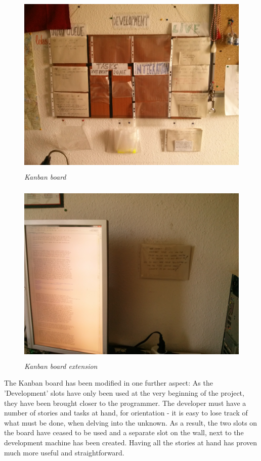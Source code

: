 \begin{figure}
\includegraphics[height=3.5in,width=6.23in]{./images/kanban/kanban_board.jpg}  
\caption{\small \sl Kanban board \label{fig:kanbanBoard}}
\end{figure}

\begin{figure}
\includegraphics[height=3.5in,width=6.23in]{./images/kanban/kanban_board_extension.jpg}  
\caption{\small \sl Kanban board extension\label{fig:kanbanBoardExtension}}
\end{figure}


The Kanban board has been modified in one further aspect: As the 'Development'
slots have only been used at the very beginning of the project, they have been
brought closer to the programmer. The developer must have a number of stories
and tasks at hand, for orientation - it is easy to lose track of what must be
done, when delving into the unknown. As a result, the two slots on the board
have ceased to be used and a separate slot on the wall, next to the development
machine has been created. Having all the stories at hand has proven much more
useful and straightforward.\newline

